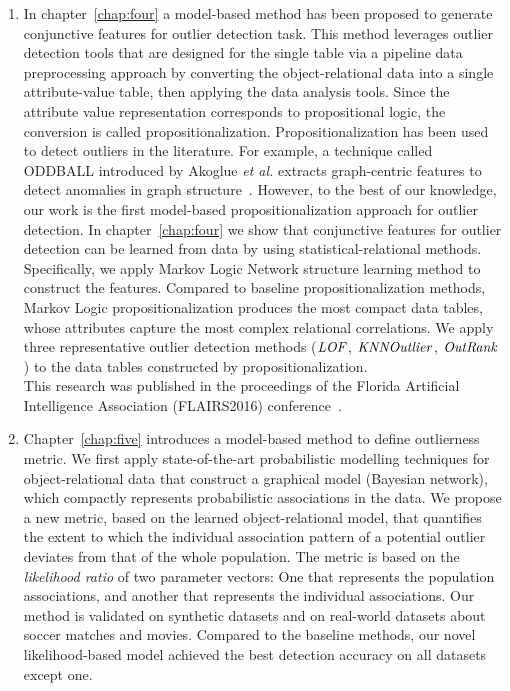  \begin{enumerate}
 	\item In chapter~\ref{chap:four} a model-based method has been proposed to generate conjunctive features for outlier detection task. This method leverages outlier detection tools that are designed for the single table via a pipeline data preprocessing approach by converting the object-relational data into a single attribute-value table, then applying the data analysis tools. Since the attribute value representation corresponds to propositional logic, the conversion is called propositionalization. Propositionalization has been used to detect outliers in the literature. For example, a technique called ODDBALL introduced by Akoglue {\em et al.} extracts graph-centric features to detect anomalies in graph structure~\cite{Akoglu2010}. However, to the best of our knowledge, our work is the first model-based propositionalization approach for outlier detection. In chapter~\ref{chap:four} we show that conjunctive features for outlier detection can be learned from data by using statistical-relational methods. Specifically, we apply
 	Markov Logic Network structure learning method to construct the features. 
 	Compared to baseline propositionalization methods, Markov Logic propositionalization produces the most compact data tables, whose attributes capture the most complex relational correlations. 
 	We apply three representative outlier detection methods ($\it{LOF}$, $\it{KNNOutlier}$, $\it{OutRank}$) to the data tables constructed by %
 	propositionalization.\\
 	This research was published in the proceedings of the Florida Artificial Intelligence Association (FLAIRS2016) conference~\cite{Riahi2016}. 
 	\item Chapter~\ref{chap:five} introduces a model-based method to define outlierness metric. We first apply state-of-the-art probabilistic modelling techniques for object-relational data that construct a graphical model (Bayesian network), which compactly represents probabilistic associations in the data. We propose a new  metric, based on the learned object-relational model, that quantifies the extent to which the individual association pattern of a potential outlier deviates from that of the whole population. The metric is based on the {\em likelihood ratio} of two parameter vectors: One that represents the population associations, and another that represents the individual associations. 
 	Our method is validated on synthetic datasets and on real-world datasets about soccer matches and movies. Compared to the baseline methods, our novel likelihood-based model achieved the best detection accuracy on all datasets except one.
 	

\end{enumerate}
